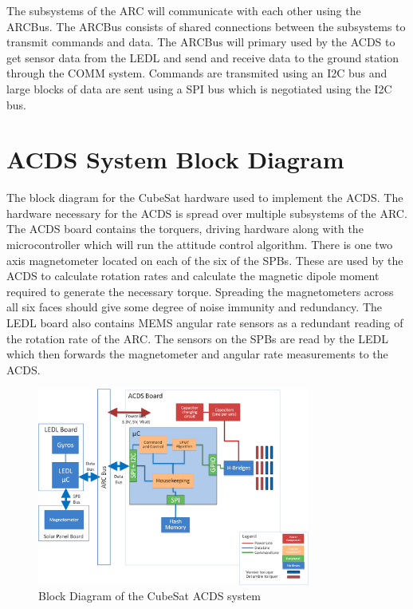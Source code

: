The subsystems of the \ac{ARC} will communicate with each other using the ARCBus. The ARCBus consists of shared connections between the subsystems to transmit commands and data. The ARCBus will primary used by the \ac{ACDS} to get sensor data from the \ac{LEDL} and send and receive data to the ground station through the COMM system. Commands are transmited using an \ac{I2C} bus and large blocks of data are sent using a SPI bus which is negotiated using the \ac{I2C} bus.

\section{\acl{ACDS} System Block Diagram}

The block diagram for the CubeSat hardware used to implement the \ac{ACDS}. The hardware necessary for the \ac{ACDS} is spread over multiple subsystems of the \ac{ARC}. The \ac{ACDS} board contains the torquers, driving hardware along with the microcontroller which will run the attitude control algorithm. There is one two axis magnetometer located on each of the six of the \acp{SPB}. These are used by the \ac{ACDS} to calculate rotation rates and calculate the magnetic dipole moment required to generate the necessary torque. Spreading the magnetometers across all six faces should give some degree of noise immunity and redundancy. The \ac{LEDL} board also contains \ac{MEMS} angular rate sensors as a redundant reading of the rotation rate of the \ac{ARC}. The sensors on the \acp{SPB} are read by the \ac{LEDL} which then forwards the magnetometer and angular rate measurements to the \ac{ACDS}.

\begin{figure}[H]
    \centering
    \includegraphics[width=0.8\textwidth]{Figures/Block}
    \caption{Block Diagram of the CubeSat \acs{ACDS} system}
\end{figure}


